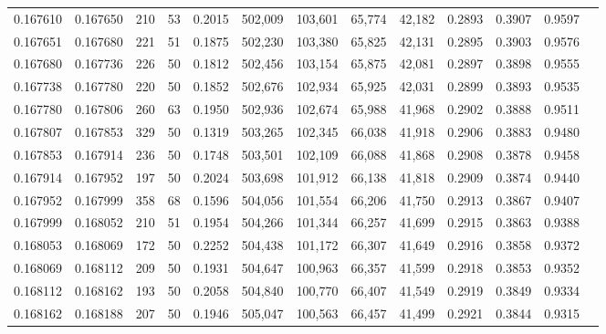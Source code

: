 \begin{tabular}{rrrrrrrrrrrrr}
0.167610 & 0.167650 &   210 &  53 &                                     0.2015 & 502,009 & 103,601 &  65,774 &  42,182 & 0.2893 & 0.3907 & 0.9597 \\
0.167651 & 0.167680 &   221 &  51 &                                     0.1875 & 502,230 & 103,380 &  65,825 &  42,131 & 0.2895 & 0.3903 & 0.9576 \\
0.167680 & 0.167736 &   226 &  50 &                                     0.1812 & 502,456 & 103,154 &  65,875 &  42,081 & 0.2897 & 0.3898 & 0.9555 \\
0.167738 & 0.167780 &   220 &  50 &                                     0.1852 & 502,676 & 102,934 &  65,925 &  42,031 & 0.2899 & 0.3893 & 0.9535 \\
0.167780 & 0.167806 &   260 &  63 &                                     0.1950 & 502,936 & 102,674 &  65,988 &  41,968 & 0.2902 & 0.3888 & 0.9511 \\
0.167807 & 0.167853 &   329 &  50 &                                     0.1319 & 503,265 & 102,345 &  66,038 &  41,918 & 0.2906 & 0.3883 & 0.9480 \\
0.167853 & 0.167914 &   236 &  50 &                                     0.1748 & 503,501 & 102,109 &  66,088 &  41,868 & 0.2908 & 0.3878 & 0.9458 \\
0.167914 & 0.167952 &   197 &  50 &                                     0.2024 & 503,698 & 101,912 &  66,138 &  41,818 & 0.2909 & 0.3874 & 0.9440 \\
0.167952 & 0.167999 &   358 &  68 &                                     0.1596 & 504,056 & 101,554 &  66,206 &  41,750 & 0.2913 & 0.3867 & 0.9407 \\
0.167999 & 0.168052 &   210 &  51 &                                     0.1954 & 504,266 & 101,344 &  66,257 &  41,699 & 0.2915 & 0.3863 & 0.9388 \\
0.168053 & 0.168069 &   172 &  50 &                                     0.2252 & 504,438 & 101,172 &  66,307 &  41,649 & 0.2916 & 0.3858 & 0.9372 \\
0.168069 & 0.168112 &   209 &  50 &                                     0.1931 & 504,647 & 100,963 &  66,357 &  41,599 & 0.2918 & 0.3853 & 0.9352 \\
0.168112 & 0.168162 &   193 &  50 &                                     0.2058 & 504,840 & 100,770 &  66,407 &  41,549 & 0.2919 & 0.3849 & 0.9334 \\
0.168162 & 0.168188 &   207 &  50 &                                     0.1946 & 505,047 & 100,563 &  66,457 &  41,499 & 0.2921 & 0.3844 & 0.9315 \\

\end{tabular}
